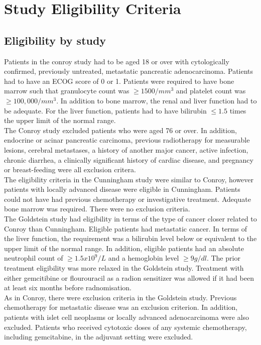 \section{Study Eligibility Criteria}
\subsection{Eligibility by study}
Patients in the conroy study had to be aged 18 or over with cytologically confirmed, previously untreated, metastatic pancreatic adenocarcinoma. Patients had to have an ECOG score of 0 or 1. Patients were required to have bone marrow such that granulocyte count was $\geq1500/mm^3$ and platelet count was $\geq100,000/mm^3$. In addition to bone marrow, the renal and liver function had to be adequate. For the liver function, patients had to have bilirubin $\leq 1.5$ times the upper limit of the normal range. \\

The Conroy study excluded patients who were aged 76 or over. In addition, endocrine or acinar pancreatic carcinoma, previous radiotherapy for measurable lesions, cerebral metastases, a history of another major cancer, active infection, chronic diarrhea, a clinically significant history of cardiac disease, and pregnancy or breast-feeding were all exclusion critera. \\

The eligibility criteria in the Cunningham study were similar to Conroy, however patients with locally advanced disease were eligible in Cunningham. Patients could not have had previous chemotherapy or investigative treatment. Adequate bone marrow was required. There were no exclusion criteria. \\

The Goldstein study had eligibility in terms of the type of cancer closer related to Conroy than Cunningham. Eligible patients had metastatic cancer. In terms of the liver function, the requirement was a bilirubin level below or equivalent to the upper limit of the normal range. In addition, eligible patients had an absolute neutrophil count of $\geq 1.5x10^9/L$ and a hemoglobin level $\geq 9g/dl$. The prior treatment eligibility was more relaxed in the Goldstein study. Treatment with either gemcitibine or flourouracil as a radion sensitizer was allowed if it had been at least six months before radnomisation. \\

As in Conroy, there were exclusion criteria in the Goldstein study. Previous chemotherapy for metastatic disease was an exclusion criterion. In addition, patients with islet cell neoplasms or locally advanced adenocarcinoma were also excluded. Patients who received cytotoxic doses of any systemic
chemotherapy, including gemcitabine, in the adjuvant setting were excluded. \\

